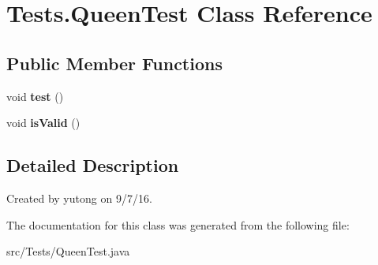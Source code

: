 \hypertarget{classTests_1_1QueenTest}{\section{Tests.\-Queen\-Test Class Reference}
\label{classTests_1_1QueenTest}
}
\subsection*{Public Member Functions}
\begin{DoxyCompactItemize}
\item 
\hypertarget{classTests_1_1QueenTest_a99dddb3dbcd30fc56fdf0fd35c8a9e55}{void {\bfseries test} ()}\label{classTests_1_1QueenTest_a99dddb3dbcd30fc56fdf0fd35c8a9e55}

\item 
\hypertarget{classTests_1_1QueenTest_a0119deab223fc6feed8df0fa0e11598a}{void {\bfseries is\-Valid} ()}\label{classTests_1_1QueenTest_a0119deab223fc6feed8df0fa0e11598a}

\end{DoxyCompactItemize}


\subsection{Detailed Description}
Created by yutong on 9/7/16. 

The documentation for this class was generated from the following file\-:\begin{DoxyCompactItemize}
\item 
src/\-Tests/Queen\-Test.\-java\end{DoxyCompactItemize}
